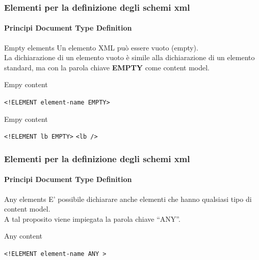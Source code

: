 \begin{frame}
    \frametitle{Elementi per la definizione degli schemi xml}
    \framesubtitle{Principi Document Type Definition}
    \addtocounter{nframe}{1}

    \begin{block}{Empty elements}
        Un elemento XML può essere vuoto (empty).
        \\ La dichiarazione di un elemento vuoto è simile alla dichiarazione di un elemento standard, ma con la parola chiave \textbf{EMPTY} come content model.
    \end{block}

    \begin{block}{Empy content}
    \begin{center}\texttt{<!ELEMENT element-name EMPTY>}\end{center}
    \end{block}

    \begin{block}{Empy content}
        \begin{center}
            \texttt{<!ELEMENT lb EMPTY>}
            \texttt{<lb />}
        \end{center}
    \end{block}

\end{frame}


\begin{frame}
    \frametitle{Elementi per la definizione degli schemi xml}
    \framesubtitle{Principi Document Type Definition}
    \addtocounter{nframe}{1}

    \begin{block}{Any elements}
        E' possibile dichiarare anche elementi che hanno qualsiasi tipo di content model.
        \\ A tal proposito viene impiegata la parola chiave  ``ANY''.
    \end{block}

    \begin{block}{Any content}
    \begin{center}\texttt{<!ELEMENT element-name ANY >}\end{center}
    \end{block}
    
\end{frame}

